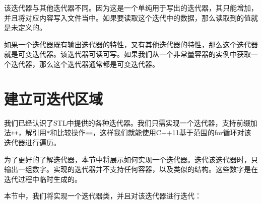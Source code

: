 
该迭代器与其他迭代器不同。因为这是一个单纯用于写出的迭代器，其只能增加，并且将对应内容写入文件当中。如果要读取这个迭代中的数据，那么读取到的值就是未定义的。


如果一个迭代器既有输出迭代器的特性，又有其他迭代器的特性，那么这个迭代器就是可变迭代器。该迭代器可读可写。如果我们从一个非常量容器的实例中获取一个迭代器，那么这个迭代器通常都是可变迭代器。


\section{建立可迭代区域}

我们已经认识了STL中提供的各种迭代器。我们只需实现一个迭代器，支持前缀加法\texttt{++}，解引用\texttt{*}和比较操作\texttt{==}，这样我们就能使用C++11基于范围的for循环对该迭代器进行遍历。

为了更好的了解迭代器，本节中将展示如何实现一个迭代器。迭代该迭代器时，只输出一组数字。实现的迭代器并不支持任何容器，以及类似的结构。这些数字是在迭代过程中临时生成的。


本节中，我们将实现一个迭代器类，并且对该迭代器进行迭代：

